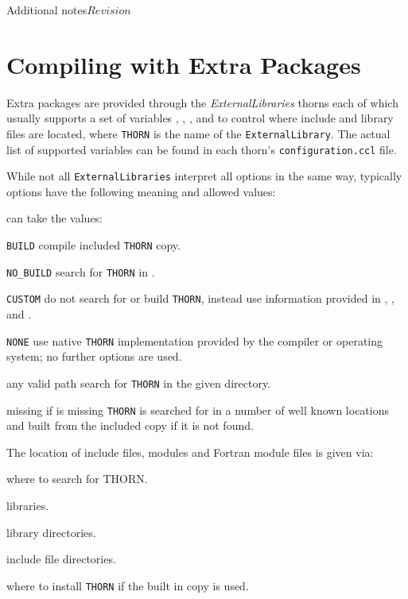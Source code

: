 \begin{cactuspart}{Additional notes}{}{$Revision$}

\section{Compiling with Extra Packages}
\label{subsec:cowiexpa}

Extra packages are provided through the \textit{ExternalLibraries} thorns each
of which usually supports a set of variables \texttt{},
\texttt{}, \texttt{}, and
\texttt{} to control where include and library files are
located, where \texttt{THORN} is the name of the \texttt{ExternalLibrary}. The
actual list of supported variables can be found in each thorn's
\texttt{configuration.ccl} file.

While not all \texttt{ExternalLibraries} interpret all options in the same way,
typically options have the following meaning and allowed values:

\texttt{} can take the values:
\begin{Lentry}
\item [\texttt{BUILD}] compile included \texttt{THORN} copy.
\item [\texttt{NO\_BUILD}] search for \texttt{THORN} in
      \texttt{}.
\item [\texttt{CUSTOM}] do not search for or build \texttt{THORN}, instead use
      information provided in \texttt{},
      \texttt{}, and \texttt{}.
\item [\texttt{NONE}] use native \texttt{THORN} implementation provided by the
      compiler or operating system; no further options are used.
\item [any valid path] search for \texttt{THORN} in the given directory.
\item [missing] if \texttt{} is missing \texttt{THORN} is searched for in
      a number of well known locations and built from the included copy if
      it is not found.
\end{Lentry}


The location of include files, modules and Fortran module files is given via:
\begin{Lentry}
\item [\texttt{\var{THORN\_DIR}}] where to search for THORN.
\item [\texttt{\var{THORN\_LIBS}}] libraries.
\item [\texttt{\var{THORN\_LIB\_DIRS}}] library directories.
\item [\texttt{\var{THORN\_INC\_DIRS}}] include file directories.
\item [\texttt{\var{THORN\_INSTALL\_DIR}}] where to install \texttt{THORN} if the
      built in copy is used.
\end{Lentry}


\end{cactuspart}
